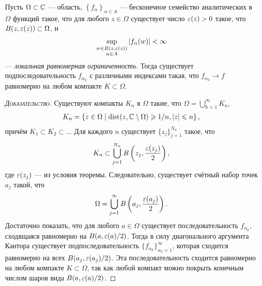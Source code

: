 \documentclass[../complex-analysis.tex]{subfiles}
\begin{document}
\begin{thm}[Монтеля]
\label{theorem:montel}
Пусть $ \Omega \subset \mathbb{C} $ --- область, $ \left\{f_{\alpha}\right\}_{\alpha \in A}  $ --- бесконечное семейство аналитических в $ \Omega $ функций такое, что для любого $ z \in \Omega $ существует число $ \varepsilon(z) > 0 $ такое, что $ B(z, \varepsilon(z)) \subset \Omega $, и \begin{align*}
  \sup_{\substack{w \in B(z, \varepsilon(z)) \\ \alpha \in A}} \left| f_\alpha(w) \right| < \infty
 \end{align*} --- \textit{локальная равномерная ограниченность.} Тогда существует подпоследовательность $ f_{\alpha_k} $ с различными индексами такая, что $f_{\alpha_k} \to f$ равномерно на любом компакте $ K \subset \Omega $.
\end{thm}
\begin{proof}[\normalfont\textsc{Доказательство}]
 Существуют компакты $ K_n $ в $ \Omega $ такие, что $ \Omega = \bigcup_{k=1}^{\infty} K_n $,
 \begin{align*}
  K_n = \left\{ z \in \Omega \mid \mathrm{dist}(z, \mathbb{C} \setminus \Omega) \geqslant 1 / n, \left| z \right| \leqslant n \right\},
 \end{align*} причём $ K_1 \subset K_2 \subset \ldots $ Для каждого $ n $ существует $ \{z_{j}\}_{j=1}^{N_n}   $ такое, что
 \begin{align*}
	 K_n \subset \bigcup_{j=1}^{N_n} B\left(z_j, \frac{\varepsilon(z_j)}{2}\right),
 \end{align*} где $ \varepsilon(z_j) $ --- из условия теоремы. Следовательно, существует счётный набор точек $ a_j $ такой, что
 \begin{align*}
	\Omega = \bigcup_{j=1}^{\infty} B\left(a_j, \frac{\varepsilon(a_j)}{2}\right).
 \end{align*} Достаточно показать, что для любого $ a \in \Omega $ существует последовательность $ f_{\alpha_k} $, сходящаяся равномерно на  $ B(a, \varepsilon(a) / 2) $. Тогда в силу диагонального аргумента Кантора существует подпоследовательность  $ \{f_{\alpha_k}\}_{\alpha_k=1}^{\infty}   $, которая сходится равномерно на всех $ B(a_j, \varepsilon(a_j) / 2) $. Эта последовательность сходится равномерно на любом компакте $ K \subset \Omega $, так как любой компакт можно покрыть конечным числом шаров вида $ B(a, \varepsilon(a) / 2) $.


\end{proof}
\end{document}
